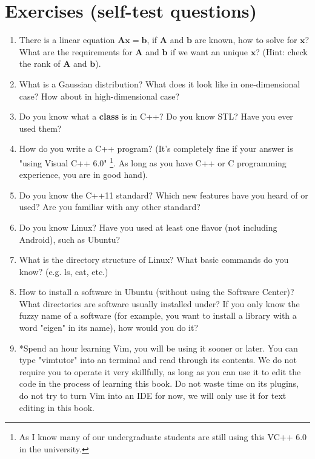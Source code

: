 \section{Exercises (self-test questions)}
\begin{enumerate}
	\item There is a linear equation $\bm{Ax}=\bm{b}$, if $\bm{A}$ and $\bm{b}$ are known, how to solve for $\bm{x}$? What are the requirements for $\bm{A}$ and $\bm{b}$ if we want an unique $\bm{x}$? (Hint: check the rank of $\bm{A}$ and $\bm{b}$).
	
	\item What is a Gaussian distribution? What does it look like in one-dimensional case? How about in high-dimensional case?
	
	\item Do you know what a \textbf{class} is in C++? Do you know STL? Have you ever used them?
	
	\item How do you write a C++ program? (It's completely fine if your answer is "using Visual C++ 6.0" \footnote{As I know many of our undergraduate students are still using this VC++ 6.0 in the university. }. As long as you have C++ or C programming experience, you are in good hand).
	
	\item Do you know the C++11 standard? Which new features have you heard of or used? Are you familiar with any other standard?
	
	\item Do you know Linux? Have you used at least one flavor (not including Android), such as Ubuntu?
	
	\item What is the directory structure of Linux? What basic commands do you know? (e.g. ls, cat, etc.)
	
	\item How to install a software in Ubuntu (without using the Software Center)? What directories are software usually installed under? If you only know the fuzzy name of a software (for example, you want to install a library with a word "eigen" in its name), how would you do it?
	
	\item *Spend an hour learning Vim, you will be using it sooner or later. You can type "vimtutor" into an terminal and read through its contents. We do not require you to operate it very skillfully, as long as you can use it to edit the code in the process of learning this book. Do not waste time on its plugins, do not try to turn Vim into an IDE for now, we will only use it for text editing in this book.
	
\end{enumerate}